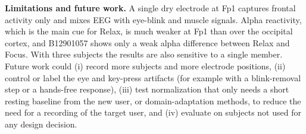 \textbf{Limitations and future work.} A single dry electrode at Fp1 captures frontal activity only and mixes EEG with eye-blink and muscle signals. Alpha reactivity, which is the main cue for Relax, is much weaker at Fp1 than over the occipital cortex, and B12901057 shows only a weak alpha difference between Relax and Focus. With three subjects the results are also sensitive to a single member. Future work could (i) record more subjects and more electrode positions, (ii) control or label the eye and key-press artifacts (for example with a blink-removal step or a hands-free response), (iii) test normalization that only needs a short resting baseline from the new user, or domain-adaptation methods, to reduce the need for a recording of the target user, and (iv) evaluate on subjects not used for any design decision.
